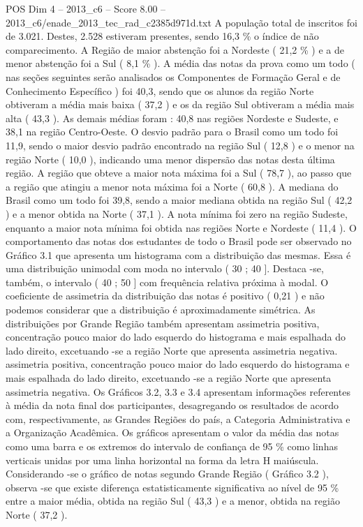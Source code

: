 \begin{textsample}{POS Dim 4 – 2013\_c6 – Score 8.00 – 2013\_c6/enade\_2013\_tec\_rad\_c2385d971d.txt}
A população total de inscritos foi de 3.021.
Destes, 2.528 estiveram presentes, sendo 16,3 \% o índice de não comparecimento.
A Região de maior abstenção foi a Nordeste ( 21,2 \% ) e a de menor abstenção foi a Sul ( 8,1 \% ).
A média das notas da prova como um todo ( nas seções seguintes serão analisados os Componentes de Formação Geral e de Conhecimento Específico ) foi 40,3, sendo que os alunos da região Norte obtiveram a média mais baixa ( 37,2 ) e os da região Sul obtiveram a média mais alta ( 43,3 ).
As demais médias foram : 40,8 nas regiões Nordeste e Sudeste, e 38,1 na região Centro-Oeste.
O desvio padrão para o Brasil como um todo foi 11,9, sendo o maior desvio padrão encontrado na região Sul ( 12,8 ) e o menor na região Norte ( 10,0 ), indicando uma menor dispersão das notas desta última região.
A região que obteve a maior nota máxima foi a Sul ( 78,7 ), ao passo que a região que atingiu a menor nota máxima foi a Norte ( 60,8 ).
A mediana do Brasil como um todo foi 39,8, sendo a maior mediana obtida na região Sul ( 42,2 ) e a menor obtida na Norte ( 37,1 ).
A nota mínima foi zero na região Sudeste, enquanto a maior nota mínima foi obtida nas regiões Norte e Nordeste ( 11,4 ).
O comportamento das notas dos estudantes de todo o Brasil pode ser observado no Gráfico 3.1 que apresenta um histograma com a distribuição das mesmas.
Essa é uma distribuição unimodal com moda no intervalo ( 30 ; 40 ].
Destaca -se, também, o intervalo ( 40 ; 50 ] com frequência relativa próxima à modal.
O coeficiente de assimetria da distribuição das notas é positivo ( 0,21 ) e não podemos considerar que a distribuição é aproximadamente simétrica.
As distribuições por Grande Região também apresentam assimetria positiva, concentração pouco maior do lado esquerdo do histograma e mais espalhada do lado direito, excetuando -se a região Norte que apresenta assimetria negativa. assimetria positiva, concentração pouco maior do lado esquerdo do histograma e mais espalhada do lado direito, excetuando -se a região Norte que apresenta assimetria negativa.
Os Gráficos 3.2, 3.3 e 3.4 apresentam informações referentes à média da nota final dos participantes, desagregando os resultados de acordo com, respectivamente, as Grandes Regiões do país, a Categoria Administrativa e a Organização Acadêmica.
Os gráficos apresentam o valor da média das notas como uma barra e os extremos do intervalo de confiança de 95 \% como linhas verticais unidas por uma linha horizontal na forma da letra H maiúscula.
Considerando -se o gráfico de notas segundo Grande Região ( Gráfico 3.2 ), observa -se que existe diferença estatisticamente significativa ao nível de 95 \% entre a maior média, obtida na região Sul ( 43,3 ) e a menor, obtida na região Norte ( 37,2 ).

\end{textsample}
